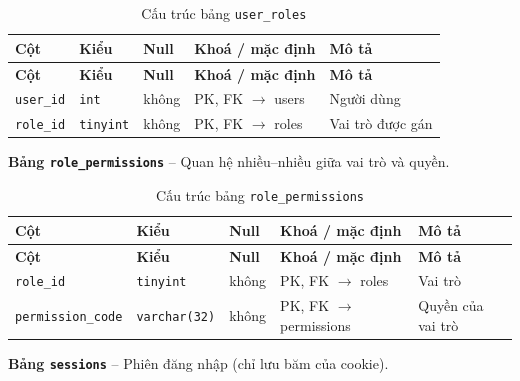 \setlength{\tabcolsep}{4pt}
\begin{longtable}{>{\raggedright\arraybackslash}p{}>{\raggedright\arraybackslash}p{}>{\centering\arraybackslash}p{}>{\raggedright\arraybackslash}p{}>{\raggedright\arraybackslash}p{}}
\caption{Cấu trúc bảng \texttt{user\_roles}}\label{tab:col_user_roles}\\
\toprule \textbf{Cột} & \textbf{Kiểu} & \textbf{Null} & \textbf{Khoá / mặc định} & \textbf{Mô tả} \\ \midrule \endfirsthead
\toprule \textbf{Cột} & \textbf{Kiểu} & \textbf{Null} & \textbf{Khoá / mặc định} & \textbf{Mô tả} \\ \midrule \endhead
\bottomrule \endfoot
\texttt{user\_id} & {\footnotesize\texttt{int}} & không & PK, FK $\rightarrow$ users & Người dùng \\
\texttt{role\_id} & {\footnotesize\texttt{tinyint}} & không & PK, FK $\rightarrow$ roles & Vai trò được gán \\
\end{longtable}

\textbf{Bảng \texttt{role\_permissions}} -- Quan hệ nhiều--nhiều giữa vai trò và quyền.

\setlength{\tabcolsep}{4pt}
\begin{longtable}{>{\raggedright\arraybackslash}p{}>{\raggedright\arraybackslash}p{}>{\centering\arraybackslash}p{}>{\raggedright\arraybackslash}p{}>{\raggedright\arraybackslash}p{}}
\caption{Cấu trúc bảng \texttt{role\_permissions}}\label{tab:col_role_permissions}\\
\toprule \textbf{Cột} & \textbf{Kiểu} & \textbf{Null} & \textbf{Khoá / mặc định} & \textbf{Mô tả} \\ \midrule \endfirsthead
\toprule \textbf{Cột} & \textbf{Kiểu} & \textbf{Null} & \textbf{Khoá / mặc định} & \textbf{Mô tả} \\ \midrule \endhead
\bottomrule \endfoot
\texttt{role\_id} & {\footnotesize\texttt{tinyint}} & không & PK, FK $\rightarrow$ roles & Vai trò \\
\texttt{permission\_code} & {\footnotesize\texttt{varchar(32)}} & không & PK, FK $\rightarrow$ permissions & Quyền của vai trò \\
\end{longtable}

\textbf{Bảng \texttt{sessions}} -- Phiên đăng nhập (chỉ lưu băm của cookie).

